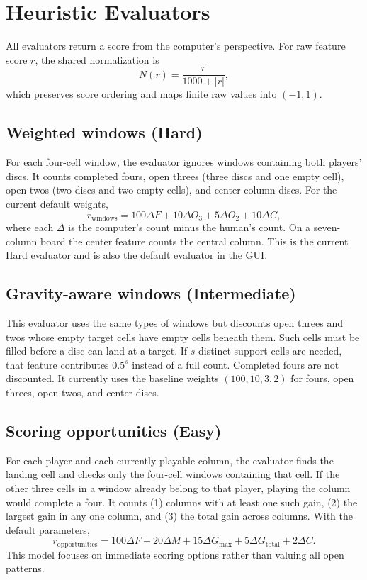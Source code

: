 \documentclass[11pt,a4paper]{article}
\begin{document}
\section{Heuristic Evaluators}\label{sec:heuristics}

All evaluators return a score from the computer's perspective. For raw feature
score $r$, the shared normalization is
\[
  N(r)=\frac{r}{1000+|r|},
\]
which preserves score ordering and maps finite raw values into $(-1,1)$.

\subsection{Weighted windows (Hard)}
For each four-cell window, the evaluator ignores windows containing both
players' discs. It counts completed fours, open threes (three discs and one
empty cell), open twos (two discs and two empty cells), and center-column
discs. For the current default weights,
\[
 r_{\mathrm{windows}}=
 100\Delta F + 10\Delta O_3 + 5\Delta O_2 + 10\Delta C,
\]
where each $\Delta$ is the computer's count minus the human's count. On a
seven-column board the center feature counts the central column. This is the
current Hard evaluator and is also the default evaluator in the GUI.

\subsection{Gravity-aware windows (Intermediate)}
This evaluator uses the same types of windows but discounts open threes and
twos whose empty target cells have empty cells beneath them. Such cells must be
filled before a disc can land at a target. If $s$ distinct support cells are
needed, that feature contributes $0.5^s$ instead of a full count. Completed
fours are not discounted. It currently uses the baseline weights
$(100,10,3,2)$ for fours, open threes, open twos, and center discs.

\subsection{Scoring opportunities (Easy)}
For each player and each currently playable column, the evaluator finds the
landing cell and checks only the four-cell windows containing that cell. If
the other three cells in a window already belong to that player, playing the
column would complete a four. It counts (1) columns with at least one such
gain, (2) the largest gain in any one column, and (3) the total gain across
columns. With the default parameters,
\[
 r_{\mathrm{opportunities}}=
 100\Delta F + 20\Delta M + 15\Delta G_{\max}
 + 5\Delta G_{\mathrm{total}} + 2\Delta C.
\]
This model focuses on immediate scoring options rather than valuing all open
patterns.
\end{document}
